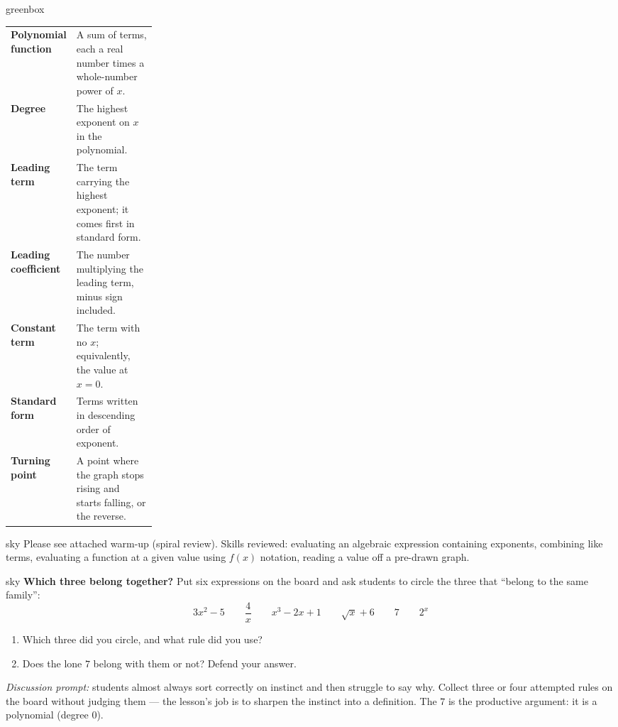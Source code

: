\documentclass[10pt]{article}
\begin{document}
\begin{skillbox}{greenbox}
\renewcommand{\arraystretch}{1.4}
\begin{tabularx}{\linewidth}{@{} >{\leavevmode\bfseries\color{plum}}p{0.24\linewidth} X @{}}
Polynomial function & A sum of terms, each a real number times a whole-number power of $x$. \\
Degree              & The highest exponent on $x$ in the polynomial. \\
Leading term        & The term carrying the highest exponent; it comes first in standard form. \\
Leading coefficient & The number multiplying the leading term, minus sign included. \\
Constant term       & The term with no $x$; equivalently, the value at $x = 0$. \\
Standard form       & Terms written in descending order of exponent. \\
Turning point       & A point where the graph stops rising and starts falling, or the reverse. \\
\end{tabularx}
\end{skillbox}

\begin{skillbox}{sky}
    Please see attached warm-up (spiral review).
    Skills reviewed: evaluating an algebraic expression containing exponents,
    combining like terms,
    evaluating a function at a given value using $f(x)$ notation,
    reading a value off a pre-drawn graph.
\end{skillbox}

\begin{skillbox}[Hook]{sky}
    \textbf{Which three belong together?} Put six expressions on the board and ask
    students to circle the three that ``belong to the same family'':
    \[
      3x^2 - 5 \qquad \frac{4}{x} \qquad x^3 - 2x + 1 \qquad
      \sqrt{x} + 6 \qquad 7 \qquad 2^x
    \]
    \begin{enumerate}[itemsep=2pt]
        \item Which three did you circle, and what rule did you use?
        \item Does the lone $7$ belong with them or not? Defend your answer.
    \end{enumerate}
    \textit{Discussion prompt:} students almost always sort correctly on instinct
    and then struggle to say why. Collect three or four attempted rules on the
    board without judging them --- the lesson's job is to sharpen the instinct into
    a definition. The $7$ is the productive argument: it is a polynomial (degree 0).
\end{skillbox}
\end{document}
